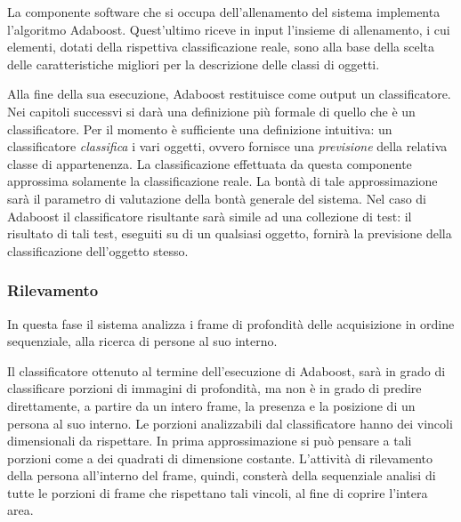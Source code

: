                 La componente software che si occupa dell'allenamento del sistema implementa l'algoritmo Adaboost.
                Quest'ultimo riceve in input l'insieme di allenamento, i cui elementi, dotati della rispettiva classificazione reale, sono alla base della scelta delle caratteristiche migliori per la descrizione delle classi di oggetti.

                Alla fine della sua esecuzione, Adaboost restituisce come output un classificatore.
                Nei capitoli successvi si darà una definizione più formale di quello che è un classificatore.
                Per il momento è sufficiente una definizione intuitiva: un classificatore \emph{classifica} i vari oggetti, ovvero fornisce una \emph{previsione} della relativa classe di appartenenza.
                La classificazione effettuata da questa componente approssima solamente la classificazione reale. La bontà di tale approssimazione sarà il parametro di valutazione della bontà generale del sistema.
                Nel caso di Adaboost il classificatore risultante sarà simile ad una collezione di test: il risultato di tali test, eseguiti su di un qualsiasi oggetto, fornirà la previsione della classificazione dell'oggetto stesso.

            \subsubsection{Rilevamento}
                In questa fase il sistema analizza i frame di profondità delle acquisizione in ordine sequenziale, alla ricerca di persone al suo interno.

                Il classificatore ottenuto al termine dell'esecuzione di Adaboost, sarà in grado di classificare porzioni di immagini di profondità, ma non è in grado di predire direttamente, a partire da un intero frame, la presenza e la posizione di un persona al suo interno.
                Le porzioni analizzabili dal classificatore hanno dei vincoli dimensionali da rispettare. In prima approssimazione si può pensare a tali porzioni come a dei quadrati di dimensione costante.
                L'attività di rilevamento della persona all'interno del frame, quindi, consterà della sequenziale analisi di tutte le porzioni di frame che rispettano tali vincoli, al fine di coprire l'intera area.

